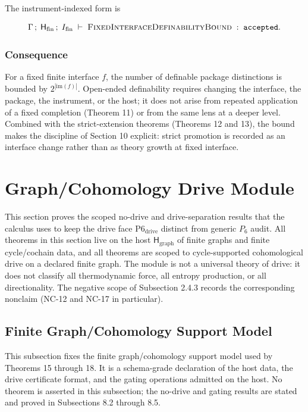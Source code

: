 \documentclass[11pt]{article}
\theoremstyle{definition}
\begin{document}
The instrument-indexed form is

\[
\Gamma\,;\;\mathsf H_{\mathrm{fin}}\,;\;I_{\mathrm{fin}}\;\vdash\;\textsc{FixedInterfaceDefinabilityBound}\;:\;\texttt{accepted}.
\]

\subsubsection{Consequence}

For a fixed finite interface \(f\), the number of definable package distinctions is bounded by \(2^{|\mathrm{im}(f)|}\). Open-ended definability requires changing the interface, the package, the instrument, or the host; it does not arise from repeated application of a fixed completion (Theorem 11) or from the same lens at a deeper level. Combined with the strict-extension theorems (Theorems 12 and 13), the bound makes the discipline of Section 10 explicit: strict promotion is recorded as an interface change rather than as theory growth at fixed interface.
 \section{Graph/Cohomology Drive Module}

This section proves the scoped no-drive and drive-separation results that the calculus uses to keep the drive face \(\mathrm{P6}_{\mathrm{drive}}\) distinct from generic \(P_6\) audit. All theorems in this section live on the host \(\mathsf H_{\mathrm{graph}}\) of finite graphs and finite cycle/cochain data, and all theorems are scoped to cycle-supported cohomological drive on a declared finite graph. The module is not a universal theory of drive: it does not classify all thermodynamic force, all entropy production, or all directionality. The negative scope of Subsection 2.4.3 records the corresponding nonclaim (NC-12 and NC-17 in particular).

\subsection{Finite Graph/Cohomology Support Model}

This subsection fixes the finite graph/cohomology support model used by Theorems 15 through 18. It is a schema-grade declaration of the host data, the drive certificate format, and the gating operations admitted on the host. No theorem is asserted in this subsection; the no-drive and gating results are stated and proved in Subsections 8.2 through 8.5.
\end{document}
